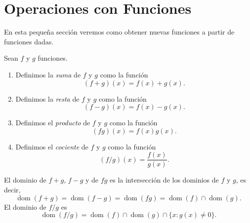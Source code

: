 \documentclass[12pt,a4paper]{book}
\DeclareMathOperator{\dom}{dom}
\begin{document}
    \section{Operaciones con Funciones}

    En esta pequeña sección veremos como obtener nuevas funciones a partir
    de funciones dadas.

    \begin{definicion}\label{def:20}
        Sean $f$ y $g$ funciones.
        \begin{enumerate}
            \item Definimos la \textit{suma} de $f$ y $g$ como la función
            \begin{equation*}
                (f+g)(x)=f(x)+g(x).
            \end{equation*}
            \item Definimos la \textit{resta} de $f$ y $g$ como la función
            \begin{equation*}
                (f-g)(x)=f(x)-g(x).
            \end{equation*}
            \item Definimos el \textit{producto} de $f$ y $g$ como la función
            \begin{equation*}
                (fg)(x)=f(x)g(x).
            \end{equation*}
            \item Definimos el \textit{cociente} de $f$ y $g$ como la función
            \begin{equation*}
                (f/g)(x)=\frac{f(x)}{g(x)}.
            \end{equation*}
        \end{enumerate}
        El dominio de $f+g$, $f-g$ y de $fg$ es la intersección de los dominios de $f$ y
        $g$, es decir,
        \begin{equation*}
            \dom(f+g)=\dom(f-g)=\dom(fg)=\dom(f)\cap\dom(g).
        \end{equation*}
        El dominio de $f/g$ es
        \begin{equation*}
            \dom(f/g)=\dom(f)\cap\dom(g)\cap\{x:g(x)\neq 0\}.
        \end{equation*}
    \end{definicion}
\end{document}
